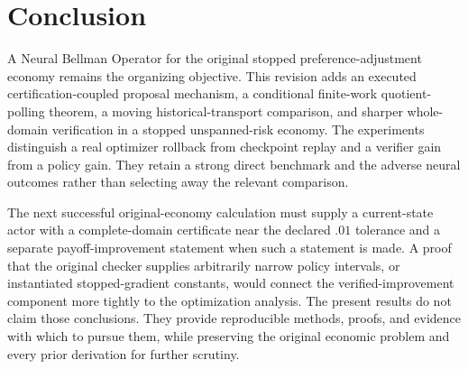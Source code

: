 \section{Conclusion}\label{sec:conclusion}
A Neural Bellman Operator for the original stopped preference-adjustment economy remains the organizing objective. This revision adds an executed certification-coupled proposal mechanism, a conditional finite-work quotient-polling theorem, a moving historical-transport comparison, and sharper whole-domain verification in a stopped unspanned-risk economy. The experiments distinguish a real optimizer rollback from checkpoint replay and a verifier gain from a policy gain. They retain a strong direct benchmark and the adverse neural outcomes rather than selecting away the relevant comparison.

The next successful original-economy calculation must supply a current-state actor with a complete-domain certificate near the declared $.01$ tolerance and a separate payoff-improvement statement when such a statement is made. A proof that the original checker supplies arbitrarily narrow policy intervals, or instantiated stopped-gradient constants, would connect the verified-improvement component more tightly to the optimization analysis. The present results do not claim those conclusions. They provide reproducible methods, proofs, and evidence with which to pursue them, while preserving the original economic problem and every prior derivation for further scrutiny.
